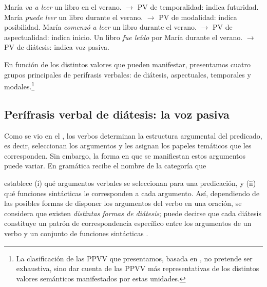 \begin{exe}
  \ex
    \begin{xlist}
      \ex\label{ex:11-valores-a} María \textit{va a leer} un libro en el verano.
          $\rightarrow$ PV de temporalidad: indica futuridad.
      \ex\label{ex:11-valores-b} María \textit{puede leer} un libro durante el
          verano. $\rightarrow$ PV de modalidad: indica posibilidad.
      \ex\label{ex:11-valores-c} María \textit{comenzó a leer} un libro durante
          el verano. $\rightarrow$ PV de aspectualidad: indica inicio.
      \ex\label{ex:11-valores-d} Un libro \textit{fue leído} por María durante el
          verano. $\rightarrow$ PV de diátesis: indica voz pasiva.
    \end{xlist}
\end{exe}

En función de los distintos valores que pueden manifestar, presentamos cuatro
grupos principales de perífrasis verbales: de diátesis, aspectuales, temporales y
modales.\footnote{La clasificación de las PPVV que presentamos, basada en
\textcite{giammatteo2009marcovecchio,giammatteo2010marcovecchio}, no pretende
ser exhaustiva, sino dar cuenta de las PPVV más representativas de los distintos
valores semánticos manifestados por estas unidades.}

\subsection{Perífrasis verbal de diátesis: la voz pasiva}\label{sec:11-pasiva}

Como se vio en el , los verbos determinan la estructura argumental del
predicado, es decir, seleccionan los argumentos y les asignan los papeles
temáticos que les corresponden. Sin embargo, la forma en que se manifiestan estos
argumentos puede variar. En gramática recibe el nombre de  la
categoría que

\begin{cita}
establece (i) qué argumentos verbales se seleccionan para una predicación, y
(ii) qué funciones sintácticas le corresponden a cada argumento. Así,
dependiendo de las posibles formas de disponer los argumentos del verbo en una
oración, se considera que existen \textit{distintas formas de diátesis}; puede
decirse que cada diátesis constituye un patrón de correspondencia específico
entre los argumentos de un verbo y un conjunto de funciones sintácticas
\parencite[222]{munoz2018}.
\end{cita}

